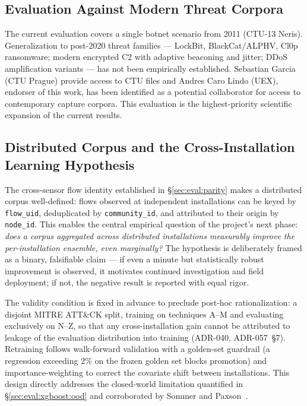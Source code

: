 \documentclass[11pt,a4paper]{article}
\begin{document}
    \subsection{Evaluation Against Modern Threat Corpora}
    \label{sec:future:corpus}
    The current evaluation covers a single botnet scenario from 2011 (CTU-13 Neris).
    Generalization to post-2020 threat families --- LockBit, BlackCat/ALPHV, Cl0p ransomware;
    modern encrypted C2 with adaptive beaconing and jitter; DDoS amplification variants ---
    has not been empirically established. Sebastian Garcia (CTU Prague) provide access to CTU files and
    Andres Caro Lindo (UEX), endorser of this work, has been identified as a potential collaborator for access to
    contemporary capture corpora.
    This evaluation is the highest-priority scientific expansion of the current results.

    \subsection{Distributed Corpus and the Cross-Installation Learning Hypothesis}
    \label{sec:future:distcorpus}
    The cross-sensor flow identity established in \S\ref{sec:eval:parity} makes a
    distributed corpus well-defined: flows observed at independent installations can be
    keyed by \texttt{flow\_uid}, deduplicated by \texttt{community\_id}, and attributed to
    their origin by \texttt{node\_id}. This enables the central empirical question of the
    project's next phase: \emph{does a corpus aggregated across distributed installations
    measurably improve the per-installation ensemble, even marginally?} The hypothesis is
    deliberately framed as a binary, falsifiable claim --- if even a minute but
    statistically robust improvement is observed, it motivates continued investigation and
    field deployment; if not, the negative result is reported with equal rigor.

    The validity condition is fixed in advance to preclude post-hoc rationalization: a
    disjoint MITRE ATT\&CK split, training on techniques A--M and evaluating exclusively on
    N--Z, so that any cross-installation gain cannot be attributed to leakage of the
    evaluation distribution into training (ADR-040, ADR-057~\S7). Retraining follows
    walk-forward validation with a golden-set guardrail (a regression exceeding 2\% on the
    frozen golden set blocks promotion) and importance-weighting to correct the covariate
    shift between installations. This design directly addresses the closed-world limitation
    quantified in \S\ref{sec:eval:xgboost:ood} and corroborated by Sommer and
    Paxson~\cite{sommer2010}.
\end{document}
